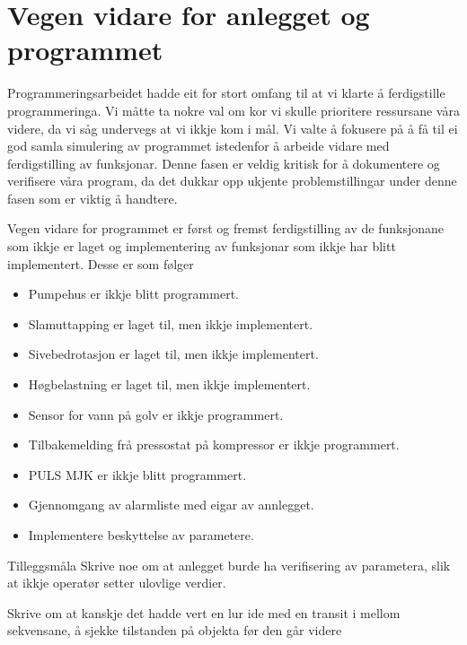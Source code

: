 \section{Vegen vidare for anlegget og programmet}
\thispagestyle{fancy}

Programmeringsarbeidet hadde eit for stort omfang til at vi klarte å ferdigstille programmeringa. 
Vi måtte ta nokre val om kor vi skulle prioritere ressursane våra videre, da vi såg undervegs at vi ikkje kom i mål. 
Vi valte å fokusere på å få til ei god samla simulering av programmet istedenfor å arbeide vidare med ferdigstilling av funksjonar.
Denne fasen er veldig kritisk for å dokumentere og verifisere våra program, da det dukkar opp ukjente problemstillingar under denne fasen som er viktig å handtere.

Vegen vidare for programmet er først og fremst ferdigstilling av de funksjonane som ikkje er laget og implementering av funksjonar som ikkje har blitt implementert. 
Desse er som følger

\begin{itemize}
    \item Pumpehus er ikkje blitt programmert. 
    \item Slamuttapping er laget til, men ikkje implementert.
    \item Sivebedrotasjon er laget til, men ikkje implementert.
    \item Høgbelastning er laget til, men ikkje implementert.
    \item Sensor for vann på golv er ikkje programmert.
    \item Tilbakemelding frå pressostat på kompressor er ikkje programmert.
    \item PULS MJK er ikkje blitt programmert.
    \item Gjennomgang av alarmliste med eigar av annlegget.
    \item Implementere beskyttelse av parametere.
\end{itemize}

Tilleggsmåla 
Skrive noe om at anlegget burde ha verifisering av parametera, slik at 
ikkje operatør setter ulovlige verdier.

Skrive om at kanskje det hadde vert en lur ide med en transit i mellom sekvensane, å sjekke tilstanden på objekta før den går videre

